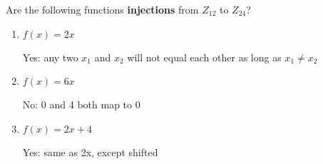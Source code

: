 \question Are the following functions \textbf{injections} 
from $Z_{12}$ to $Z_{24}$?
\begin{enumerate}[label=\alph*.]
\item $f(x) = 2x$
\begin{solution}[0.3 in]
Yes: any two $x_1$ and $x_2$ will not equal each other as long as 
$x_1 \neq x_2$
\end{solution}

\item $f(x) = 6x$
\begin{solution}[0.3 in]
No: 0 and 4 both map to 0
\end{solution}

\item $f(x) = 2x + 4$
\begin{solution}[0.3 in]
Yes: same as 2x, except shifted
\end{solution}
\end{enumerate}